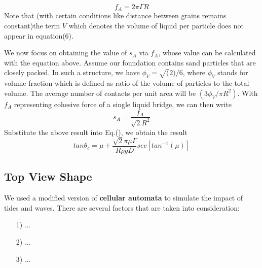 \documentclass[12pt]{article}
\begin{document}
$$f_A = 2\pi \Gamma R$$
Note that (with certain conditions like distance between grains remains constant)the term $V$ which denotes the volume of liquid per particle does not appear in equation(6).
\par
We now focus on obtaining the value of $s_A$ via $f_A$, whose value can be calculated with the equation above. Assume our foundation contains sand particles that are closely packed. In such a structure, we have $\phi_V = \sqrt(2)/6$, where $\phi_V$ stands for volume fraction which is defined as ratio of the volume of particles to the total volume. The average number of contacts per unit area will be $(3\phi_V/\pi R^2)$. With $f_A$ representing cohesive force of a single liquid bridge, we can then write
$$ s_A = \frac{f_A}{\sqrt{2}R^2}$$
Substitute the above result into Eq.(), we obtain the result
$$ tan\theta_c = \mu + \frac{\sqrt{2}\pi\mu\Gamma}{R\rho gD}sec[tan^{-1}(\mu)] $$

\subsection{Top View Shape}
\par
We used a modified version of\textbf{ cellular automata} to simulate the impact of tides and waves. There are several factors that are taken into consideration:
\par
\begin{itemize}
    \item [1)]
          ...
    \item [2)]
          ...
    \item [3)]
          ...
\end{itemize}
\end{document}
